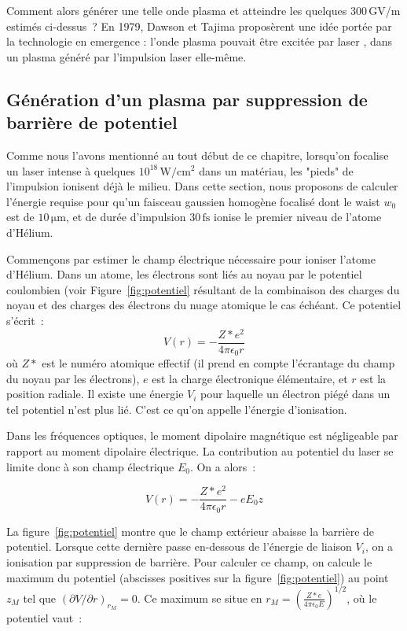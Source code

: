 \documentclass[a4paper]{book}
\begin{document}
\medskip

Comment alors générer une telle onde plasma et atteindre les quelques 300$\,$GV/m estimés ci-dessus~? En 1979, Dawson et Tajima proposèrent une idée portée par la technologie en emergence : l'onde plasma pouvait être excitée par laser \cite{tajima}, dans un plasma généré par l'impulsion laser elle-même. 

\subsection{Génération d'un plasma par suppression de barrière de potentiel}

Comme nous l'avons mentionné au tout début de ce chapitre, lorsqu'on focalise un laser intense à quelques $10^{18}\,\mathrm{W/cm^2}$ dans un matériau, les "pieds" de l'impulsion ionisent déjà le milieu. Dans cette section, nous proposons de calculer l'énergie requise pour qu'un faisceau gaussien homogène focalisé dont le waist $w_0$ est de $10\,\mathrm{\mu m}$, et de durée d'impulsion $30\,\mathrm{fs}$ ionise le premier niveau de l'atome d'Hélium. 

Commençons par estimer le champ électrique nécessaire pour ioniser l'atome d'Hélium. Dans un atome, les électrons sont liés au noyau par le potentiel coulombien (voir Figure~\ref{fig:potentiel} résultant de la combinaison des charges du noyau et des charges des électrons du nuage atomique le cas échéant. Ce potentiel s'écrit~:
\begin{equation}
    V(r)=-\frac{Z*e^2}{4\pi\epsilon_0r}
\end{equation}
où $Z*$ est le numéro atomique effectif (il prend en compte l'écrantage du champ du noyau par les électrons), $e$ est la charge électronique élémentaire, et $r$ est la position radiale. Il existe une énergie $V_i$ pour laquelle un électron piégé dans un tel potentiel n'est plus lié. C'est ce qu'on appelle l'énergie d'ionisation. 

Dans les fréquences optiques, le moment dipolaire magnétique est négligeable par rapport au moment dipolaire électrique. La contribution au potentiel du laser se limite donc à son champ électrique $E_0$. On a alors~:

\begin{equation}
    V(r)=-\frac{Z*e^2}{4\pi\epsilon_0r}-eE_0z
\end{equation}

La figure~\ref{fig:potentiel} montre que le champ extérieur abaisse la barrière de potentiel. Lorsque cette dernière passe en-dessous de l'énergie de liaison $V_i$, on a ionisation par suppression de barrière. Pour calculer ce champ, on calcule le maximum du potentiel (abscisses positives sur la figure~\ref{fig:potentiel}) au point $z_M$ tel que $\left(\partial V/\partial r\right)_{r_M}=0$. Ce maximum se situe en $r_M=\left(\frac{Z*e}{4\pi\epsilon_0E}\right)^{1/2}$, où le potentiel vaut~:
\end{document}
